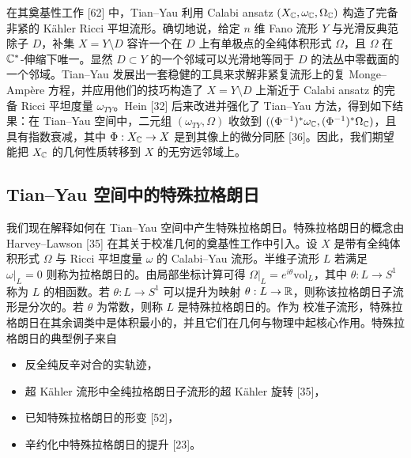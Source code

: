 在其奠基性工作 [62] 中，Tian--Yau 利用 Calabi ansatz $(X_{\mathbb{C}},\omega_{\mathbb{C}},\Omega_{\mathbb{C}})$ 构造了完备非紧的 Kähler Ricci 平坦流形。确切地说，给定 $n$ 维 Fano 流形 $Y$ 与光滑反典范除子 $D$，补集 $X=Y\setminus D$ 容许一个在 $D$ 上有单极点的全纯体积形式 $\Omega$，且 $\Omega$ 在 $\mathbb{C}^*$-伸缩下唯一。显然 $D\subset Y$ 的一个邻域可以光滑地等同于 $D$ 的法丛中零截面的一个邻域。Tian--Yau 发展出一套稳健的工具来求解非紧复流形上的复 Monge--Ampère 方程，并应用他们的技巧构造了 $X=Y\setminus D$ 上渐近于 Calabi ansatz 的完备 Ricci 平坦度量 $\omega_{TY}$。Hein [32] 后来改进并强化了 Tian--Yau 方法，得到如下结果：在 Tian--Yau 空间中，二元组 $(\omega_{TY},\Omega)$ 收敛到 $((\Phi^{-1})^*\omega_{\mathbb{C}},(\Phi^{-1})^*\Omega_{\mathbb{C}})$，且具有指数衰减，其中 $\Phi:X_{\mathbb{C}}\to X$ 是到其像上的微分同胚 [36]。因此，我们期望能把 $X_{\mathbb{C}}$ 的几何性质转移到 $X$ 的无穷远邻域上。

\subsection{Tian--Yau 空间中的特殊拉格朗日}
我们现在解释如何在 Tian--Yau 空间中产生特殊拉格朗日。特殊拉格朗日的概念由 Harvey--Lawson [35] 在其关于校准几何的奠基性工作中引入。设 $X$ 是带有全纯体积形式 $\Omega$ 与 Ricci 平坦度量 $\omega$ 的 Calabi--Yau 流形。半维子流形 $L$ 若满足 $\omega|_L=0$ 则称为拉格朗日的。由局部坐标计算可得 $\Omega|_L=e^{i\theta}\mathrm{vol}_L$，其中 $\theta:L\to S^1$ 称为 $L$ 的相函数。若 $\theta:L\to S^1$ 可以提升为映射 $\theta:L\to\mathbb{R}$，则称该拉格朗日子流形是分次的。若 $\theta$ 为常数，则称 $L$ 是特殊拉格朗日的。作为 校准子流形，特殊拉格朗日在其余调类中是体积最小的，并且它们在几何与物理中起核心作用。特殊拉格朗日的典型例子来自
\begin{itemize}
\item 反全纯反辛对合的实轨迹，
\item 超 Kähler 流形中全纯拉格朗日子流形的超 Kähler 旋转 [35]，
\item 已知特殊拉格朗日的形变 [52]，
\item 辛约化中特殊拉格朗日的提升 [23]。
\end{itemize}

